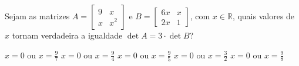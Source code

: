 Sejam as matrizes $A = \left[ \begin{array}{cc}
9 & x \\
x & x^2
\end{array} \right]$ e $B = \left[ \begin{array}{cc}
6x & x \\
2x & 1
\end{array} \right]$, com $x\in\mathbb{R}$, quais valores de $x$ tornam verdadeira a igualdade $\det A=3\cdot\det B$?

$x=0$ ou $x=\frac{9}{7}$
$x=0$ ou $x=\frac{9}{4}$
$x=0$ ou $x=\frac{9}{5}$
$x=0$ ou $x=\frac{3}{2}$
$x=0$ ou $x=\frac{9}{8}$


